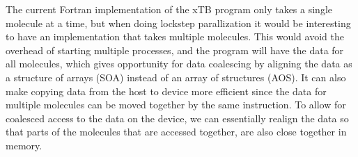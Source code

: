 The current Fortran implementation of the xTB program only takes a single molecule at a time, but when doing lockstep parallization it would be interesting to have an implementation that takes multiple molecules. This would avoid the overhead of starting multiple processes, and the program will have the data for all molecules, which gives opportunity for data coalescing by aligning the data as a structure of arrays (SOA) instead of an array of structures (AOS). It can also make copying data from the host to device more efficient since the data for multiple molecules can be moved together by the same instruction. To allow for coalesced access to the data on the device, we can essentially realign the data so that parts of the molecules that are accessed together, are also close together in memory.%

